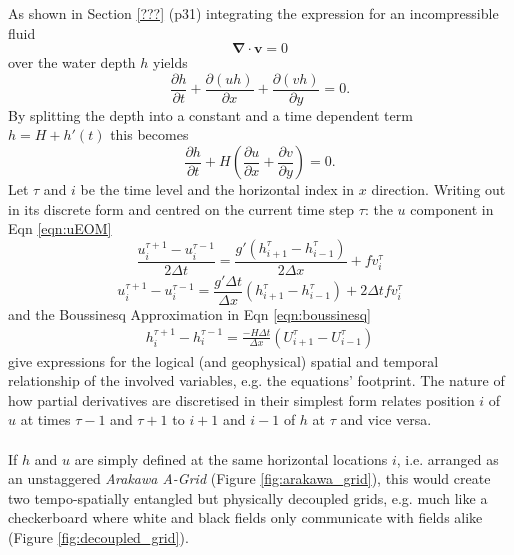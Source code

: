 %
As shown in Section \ref{???} (p31) integrating the expression for an incompressible fluid 
\begin{equation}
 \boldsymbol{\nabla}\cdot\boldsymbol{v} = 0
\end{equation}
over the water depth $h$ yields 
\begin{equation}
\frac{\partial h}{\partial t} + \frac{\partial (uh)}{\partial x} + \frac{\partial (vh)}{\partial y} = 0.\label{eqn:boussinesq}
\end{equation}
By splitting the depth into a constant and a time dependent term $h = H+h'(t)$ this becomes 
\begin{equation}
\frac{\partial h}{\partial t} + H\left(\frac{\partial u}{\partial x} + \frac{\partial v}{\partial y}\right) = 0.
\end{equation}
%
%
Let $\tau$ and $i$ be the time level and the horizontal index in $x$ direction.  Writing out in its discrete form and centred on the current time step $\tau$: the $u$ component in Eqn \ref{eqn:uEOM} 
%
\begin{equation}
\frac{u_i^{\tau+1} - u_i^{\tau-1}}{2\Delta t} = \frac{g'(h^\tau_{i+1}-h^\tau_{i-1})}{2\Delta x} + fv_{i}^{\tau}
\end{equation}
\begin{equation}
u_i^{\tau+1} - u_i^{\tau-1} =  \frac{g'\Delta t}{\Delta x} (h^\tau_{i+1}-h^\tau_{i-1}) + 2\Delta t fv_{i}^{\tau}
\end{equation}
and the Boussinesq Approximation in Eqn \ref{eqn:boussinesq}
\begin{eqnarray}
h_i^{\tau+1}-h_i^{\tau-1} = \frac{-H \Delta t}{\Delta x} (U^\tau_{i+1}-U^\tau_{i-1})
\end{eqnarray}
%
give expressions for the logical (and geophysical) spatial and temporal relationship of the involved  variables, e.g. the equations' footprint.  The nature of how partial derivatives are discretised in their simplest form relates position $i$ of $u$ at times $\tau-1$ and $\tau+1$ to $i+1$ and $i-1$ of $h$ at 
$\tau$ and vice versa.  
\paragraph*{}
If $h$ and $u$ are simply defined at the same horizontal locations $i$, i.e. arranged as an unstaggered \textit{Arakawa A-Grid} (Figure \ref{fig:arakawa_grid}), this would create two tempo-spatially entangled but physically decoupled grids, e.g. much like a checkerboard where white and black fields only communicate with fields alike (Figure \ref{fig:decoupled_grid}). 
%

